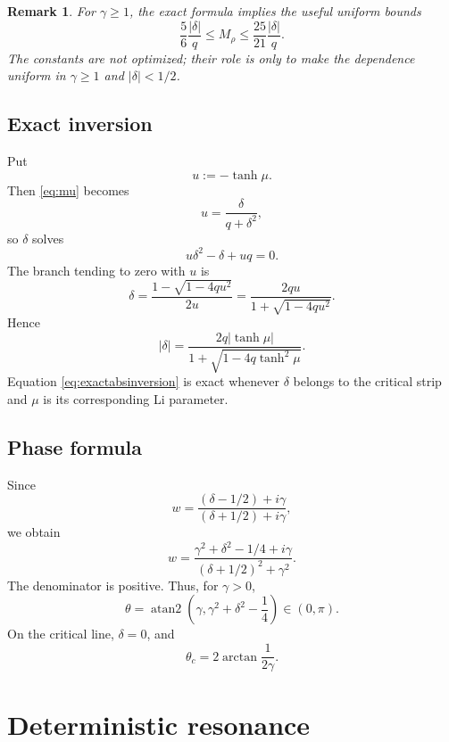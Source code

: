 \documentclass[11pt]{article}
\newtheorem{remark}[theorem]{Remark}
\begin{document}
\begin{remark}
For \(\gamma\ge1\), the exact formula implies the useful uniform bounds
\begin{equation}
\frac56\frac{|\delta|}{q}
\le M_\rho
\le \frac{25}{21}\frac{|\delta|}{q}.
\label{eq:uniformbounds}
\end{equation}
The constants are not optimized; their role is only to make the dependence uniform in \(\gamma\ge1\) and \(|\delta|<1/2\).
\end{remark}

\subsection{Exact inversion}

Put
\[
u:=-\tanh\mu.
\]
Then \eqref{eq:mu} becomes
\[
u=\frac{\delta}{q+\delta^2},
\]
so \(\delta\) solves
\[
u\delta^2-\delta+uq=0.
\]
The branch tending to zero with $u$ is
\begin{equation}
\delta
=
\frac{1-\sqrt{1-4q u^2}}{2u}
=
\frac{2qu}{1+\sqrt{1-4q u^2}}.
\label{eq:exactinversion}
\end{equation}
Hence
\begin{equation}
|\delta|
=
\frac{2q|\tanh\mu|}
{1+\sqrt{1-4q\tanh^2\mu}}.
\label{eq:exactabsinversion}
\end{equation}
Equation \eqref{eq:exactabsinversion} is exact whenever \(\delta\) belongs to the critical strip and \(\mu\) is its corresponding Li parameter.

\subsection{Phase formula}

Since
\[
w
=\frac{(\delta-1/2)+i\gamma}{(\delta+1/2)+i\gamma},
\]
we obtain
\begin{equation}
w
=
\frac{\gamma^2+\delta^2-1/4+i\gamma}
{(\delta+1/2)^2+\gamma^2}.
\label{eq:phaserep}
\end{equation}
The denominator is positive. Thus, for \(\gamma>0\),
\begin{equation}
\theta
=
\operatorname{atan2}\left(\gamma,\gamma^2+\delta^2-\frac14\right)\in(0,\pi).
\label{eq:phase}
\end{equation}
On the critical line, \(\delta=0\), and
\begin{equation}
\theta_c
=2\arctan\frac1{2\gamma}.
\label{eq:criticalphase}
\end{equation}

\section{Deterministic resonance}
\end{document}
